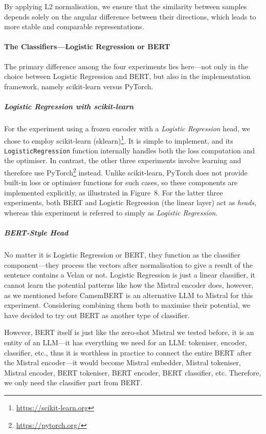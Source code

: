 \documentclass[12pt]{article}
\begin{document}
By applying L2 normalisation, we ensure that the similarity between samples depends solely on the angular difference between their directions, which leads to more stable and comparable representations.

\paragraph{The Classifiers\;---\;Logistic Regression or BERT}
The primary difference among the four experiments lies here\;---\;not only in the choice between Logistic Regression and BERT, but also in the implementation framework, namely scikit-learn versus PyTorch.

\subparagraph{Logistic Regression with scikit-learn}
For the experiment using a frozen encoder with a \textit{Logistic Regression} head, we chose to employ scikit-learn (sklearn)\footnote{\url{https://scikit-learn.org}}. 
It is simple to implement, and its \texttt{LogisticRegression} function internally handles both the loss computation and the optimiser. 
In contrast, the other three experiments involve learning and therefore use PyTorch\footnote{\url{https://pytorch.org/}} instead. 
Unlike scikit-learn, PyTorch does not provide built-in loss or optimiser functions for such cases, so these components are implemented explicitly, as illustrated in Figure~8. 
For the latter three experiments, both BERT and Logistic Regression (the linear layer) act as \textit{heads}, whereas this experiment is referred to simply as \textit{Logistic Regression}.

\subparagraph{BERT-Style Head}
No matter it is Logistic Regression or BERT, they function as the classifier component\;---\;they process the vectors after normalisation to give a result of the sentence contains a Velan or not. Logistic Regression is just a linear classifier, it cannot learn the potential patterns like how the Mistral encoder does, however, as we mentioned before CamemBERT is an alternative LLM to Mistral for this experiment. Considering combining them both to maximise their potential, we have decided to try out BERT as another type of classifier.

However, BERT itself is just like the zero-shot Mistral we tested before, it is an entity of an LLM\;---\;it has everything we need for an LLM: tokeniser, encoder, classifier, etc., thus it is worthless in practice to connect the entire BERT after the Mistral encoder\;---\;it would become Mistral embedder, Mistral tokeniser, Mistral encoder, BERT tokeniser, BERT encoder, BERT classifier, etc. Therefore, we only need the classifier part from BERT. 
\end{document}
